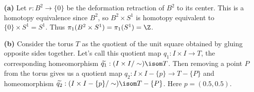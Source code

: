 \documentclass[11pt,letterpaper]{article}
\begin{document}
\begin{solution}
    \textbf{(a)} Let $r : B^2 \to \{0\}$ be the deformation retraction of $B^2$ to its center. This is a homotopy equivalence since $B^2$, so $B^2\times S^1$ is homotopy equivalent to $\{0\}\times S^1=S^1$. Thus $\pi_1(B^2\times S^1)=\pi_1(S^1)=\Z$.
    
    \begin{center}
    \end{center}
    
    \textbf{(b)} Consider the torus $T$ as the quotient of the unit square obtained by gluing opposite sides together. Let's call this quotient map $q_1 : I\times I \to T$, the corresponding homeomorphism $\widetilde{q_1} : (I\times I /\sim) \isom T$. Then removing a point $P$ from the torus gives us a quotient map $q_2 : I\times I-\{p\} \to T-\{P\}$ and homeomorphism $\widetilde{q_2} : (I\times I-\{p\} / \sim) \isom T-\{P\}$. Here $p=(0.5,0.5)$.


\end{solution}
\end{document}
